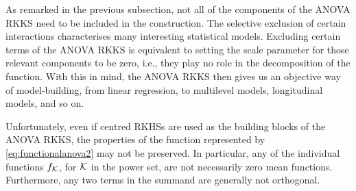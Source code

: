 As remarked in the previous subsection, not all of the components of the ANOVA RKKS need to be included in the construction.
The selective exclusion of certain interactions characterises many interesting statistical models.
Excluding certain terms of the ANOVA RKKS is equivalent to setting the scale parameter for those relevant components to be zero, i.e., they play no role in the decomposition of the function.
With this in mind, the ANOVA RKKS then gives us an objective way of model-building, from linear regression, to multilevel models, longitudinal models, and so on.

\begin{remark}
  Unfortunately, even if centred RKHSs are used as the building blocks of the ANOVA RKKS, the properties of the function represented by \eqref{eq:functionalanova2} may not be preserved.
  In particular, any of the individual functions $f_{\mathcal K}$, for ${\mathcal K}$ in the power set, are not necessarily zero mean functions.
  Furthermore, any two terms in the summand are generally not orthogonal.
\end{remark}

